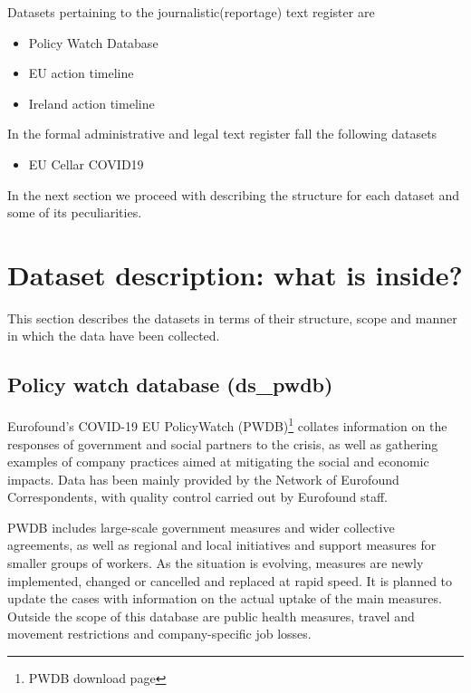 Datasets pertaining to the journalistic(reportage) text register are

\begin{itemize}
	\item Policy Watch Database 
	\item EU action timeline

	\item Ireland action timeline
\end{itemize}

In the formal administrative and legal text register fall the following datasets

\begin{itemize}
	\item EU Cellar COVID19 
\end{itemize}

In the next section we proceed with describing the structure for each dataset and some of its peculiarities.

\section{Dataset description: what is inside? }

This section describes the datasets in terms of their structure, scope and manner in which the data have been collected. 

\subsection{Policy watch database (ds\_pwdb)}

Eurofound’s COVID-19 EU PolicyWatch (PWDB)\footnote{ PWDB download page  } collates information on the responses of government and social partners to the crisis, as well as gathering examples of company practices aimed at mitigating the social and economic impacts. Data has been mainly provided by the Network of Eurofound Correspondents, with quality control carried out by Eurofound staff.

PWDB includes large-scale government measures and wider collective agreements, as well as regional and local initiatives and support measures for smaller groups of workers. As the situation is evolving, measures are newly implemented, changed or cancelled and replaced at rapid speed. It is planned to update the cases with information on the actual uptake of the main measures. Outside the scope of this database are public health measures, travel and movement restrictions and company-specific job losses. 

